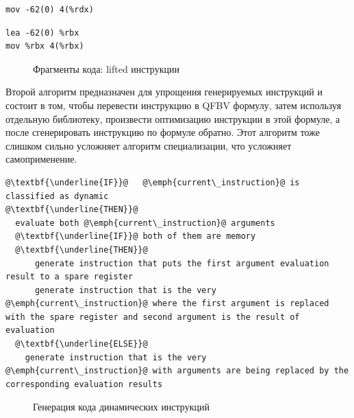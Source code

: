\newsavebox\boxfive
\begin{lrbox}{\boxfive}
\begin{lstlisting}[xleftmargin = 20pt]
mov -62(0) 4(%rdx)
\end{lstlisting}
\end{lrbox}

\newsavebox\boxsix
\begin{lrbox}{\boxsix}
\begin{lstlisting}[xleftmargin = 20pt]
lea -62(0) %rbx 
mov %rbx 4(%rbx)
\end{lstlisting}
\end{lrbox}

\begin{figure}[t!]
	\centering
	\begin{subfigure}[b]{0.32\textwidth}
		\centering
        \usebox\boxfour
        \caption{\label{fig:qfbv1}}
    \end{subfigure}
	\begin{subfigure}[b]{0.32\textwidth}
		\centering
        \usebox\boxfive
        \caption{\label{fig:qfbv22}}
    \end{subfigure}
	\begin{subfigure}[b]{0.32\textwidth}
		\centering
        \usebox\boxsix
        \caption{\label{fig:qfbv1}}
    \end{subfigure}
\caption{Фрагменты кода: lifted инструкции}
\end{figure}

Второй алгоритм предназначен для упрощения генерируемых инструкций и состоит в том, чтобы перевести инструкцию в QFBV формулу, затем используя отдельную библиотеку, произвести оптимизацию инструкции в этой формуле, а после сгенерировать инструкцию по формуле обратно. Этот алгоритм тоже слишком сильно усложняет алгоритм специализации, что усложняет самоприменение.

\newsavebox\boxminustwo
\begin{lrbox}{\boxminustwo}
\begin{lstlisting}[xleftmargin = 20pt]
@\textbf{\underline{IF}}@   @\emph{current\_instruction}@ is classified as dynamic
@\textbf{\underline{THEN}}@
  evaluate both @\emph{current\_instruction}@ arguments
  @\textbf{\underline{IF}}@ both of them are memory
  @\textbf{\underline{THEN}}@
      generate instruction that puts the first argument evaluation result to a spare register
      generate instruction that is the very @\emph{current\_instruction}@ where the first argument is replaced with the spare register and second argument is the result of evaluation
  @\textbf{\underline{ELSE}}@
    generate instruction that is the very @\emph{current\_instruction}@ with arguments are being replaced by the corresponding evaluation results
\end{lstlisting}
\end{lrbox}
\begin{figure}[!t]
\centering
\usebox\boxminustwo
\caption{Генерация кода динамических инструкций\label{fig:generate}}
\end{figure}

